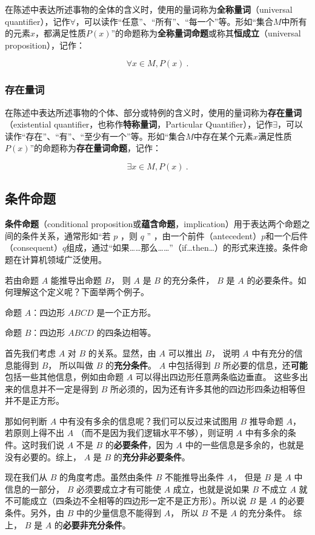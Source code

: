 在陈述中表达所述事物的全体的含义时，使用的量词称为\textbf{全称量词}（universal quantifier），记作$\forall$，可以读作“任意”、“所有”、“每一个”等。形如“集合$M$中所有的元素$x$，都满足性质$P(x)$”的命题称为\textbf{全称量词命题}或称其\textbf{恒成立}（universal proposition），记作：


\begin{equation}
\forall x\in M,P(x)~.
\end{equation}

\subsubsection{存在量词}

在陈述中表达所述事物的个体、部分或特例的含义时，使用的量词称为\textbf{存在量词}（existential quantifier，也称作\textbf{特称量词}，Particular Quantifier），记作$\exists$，可以读作“存在”、“有”、“至少有一个”等。形如“集合$M$中存在某个元素$x$满足性质$P(x)$”的命题称为\textbf{存在量词命题}，记作：

\begin{equation}
\exists x\in M,P(x)~.
\end{equation}

\subsection{条件命题}

\textbf{条件命题}（conditional proposition或\textbf{蕴含命题}，implication）用于表达两个命题之间的条件关系，通常形如“若 $p$ ，则 $q$ ” ，由一个前件（antecedent）$p$和一个后件（consequent）$q$组成，通过“如果……那么……”（if…then…）的形式来连接。条件命题在计算机领域广泛使用。

若由命题 $A$ 能推导出命题 $B$， 则 $A$ 是 $B$ 的充分条件， $B$ 是 $A$ 的必要条件。如何理解这个定义呢？下面举两个例子。

\begin{example}{}
命题 $A$：四边形 $ABCD$ 是一个正方形。

命题 $B$：四边形 $ABCD$ 的四条边相等。

首先我们考虑 $A$ 对 $B$ 的关系。显然，由 $A$ 可以推出 $B$， 说明 $A$ 中有充分的信息能得到 $B$， 所以叫做 $B$ 的\textbf{充分条件}。 $A$ 中包括得到 $B$ 所必要的信息，还\textbf{可能}包括一些其他信息，例如由命题 $A$ 可以得出四边形任意两条临边垂直。 这些多出来的信息并不一定是得到 $B$ 所必须的，因为还有许多其他的四边形四条边相等但并不是正方形。

那如何判断 $A$ 中有没有多余的信息呢？我们可以反过来试图用 $B$ 推导命题 $A$， 若原则上得不出 $A$ （而不是因为我们逻辑水平不够），则证明 $A$ 中有多余的条件。这时我们说 $A$ 不是 $B$ 的\textbf{必要条件}，因为 $A$ 中的一些信息是多余的，也就是没有必要的。综上， $A$ 是 $B$ 的\textbf{充分非必要条件}。

现在我们从 $B$ 的角度考虑。虽然由条件 $B$ 不能推导出条件 $A$， 但是 $B$ 是 $A$ 中信息的一部分， $B$ 必须要成立才有可能使 $A$ 成立，也就是说如果 $B$ 不成立 $A$ 就不可能成立（四条边不全相等的四边形一定不是正方形）。所以说 $B$ 是 $A$ 的必要条件。另外，由 $B$ 中的少量信息不能得到 $A$， 所以 $B$ 不是 $A$ 的充分条件。 综上， $B$ 是 $A$ 的\textbf{必要非充分条件}。
\end{example}


